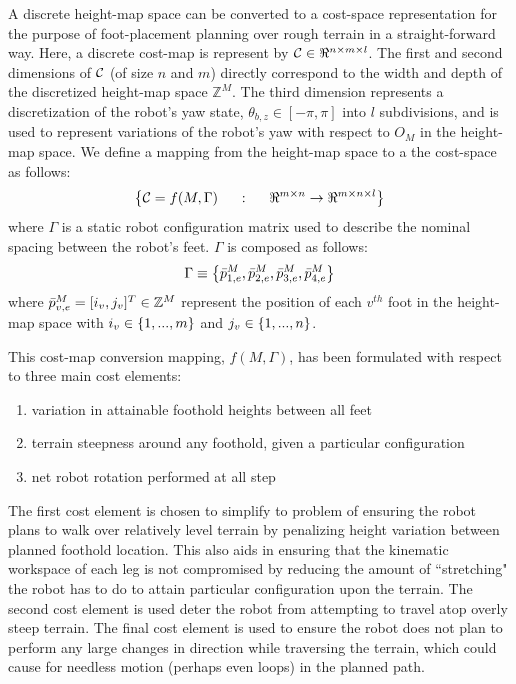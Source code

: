 			A discrete height-map space can be converted to a cost-space representation for the purpose of foot-placement planning over rough terrain in a straight-forward way. Here, a discrete cost-map is represent by ${\cal C}\in\Re^{n\times m\times l}$. The first and second dimensions of ${\cal C}$ (of size $n$ and $m$) directly correspond to the width and depth of the discretized height-map space $\mathbb{Z}^{M}$. The third dimension represents a discretization of the robot's yaw state, $\theta_{b,z}\in[-\pi,\pi]$ into $l$ subdivisions, and is used to represent variations of the robot's yaw with respect to $O_{M}$ in the height-map space. We define a mapping from the height-map space to a the cost-space as follows:
				\begin{equation}
					\left\{ {\cal C} = f(M,\Gamma) \hspace{5mm} : \hspace{5mm} \Re^{m\times n} \rightarrow \Re^{m\times n \times l} \right\}
					\label{eq::cost_mapping}
				\end{equation}
			where $\Gamma$ is a static robot configuration matrix used to describe the nominal spacing between the robot's feet. $\Gamma$ is composed as follows:
				\begin{equation*}
					\Gamma \equiv \left\{\bar{p}_{1,e}^{M},\bar{p}_{2,e}^{M},\bar{p}_{3,e}^{M},\bar{p}_{4,e}^{M}\right\}
					\label{eq::cost_gamma}
				\end{equation*}
			where $\bar{p}_{v,e}^{M}=[i_{v},j_{v}]^{T}\in{\Bbb Z}^{M}$ represent the position of each $v^{th}$ foot in the height-map space with $i_{v}\in \left\{1,...,m\right\}$ and $j_{v}\in\left\{1,...,n\right\}$.
			
			This cost-map conversion mapping, $f(M,\Gamma)$, has been formulated with respect to three main cost elements:
				\begin{enumerate}
					\item variation in attainable foothold heights between all feet
					\item terrain steepness around any foothold, given a particular configuration
					\item net robot rotation performed at all step
				\end{enumerate}
			The first cost element is chosen to simplify to problem of ensuring the robot plans to walk over relatively level terrain by penalizing height variation between planned foothold location. This also aids in ensuring that the kinematic workspace of each leg is not compromised by reducing the amount of ``stretching" the robot has to do to attain particular configuration upon the terrain. The second cost element is used deter the robot from attempting to travel atop overly steep terrain. The final cost element is used to ensure the robot does not plan to perform any large changes in direction while traversing the terrain, which could cause for needless motion (perhaps even loops) in the planned path. 

